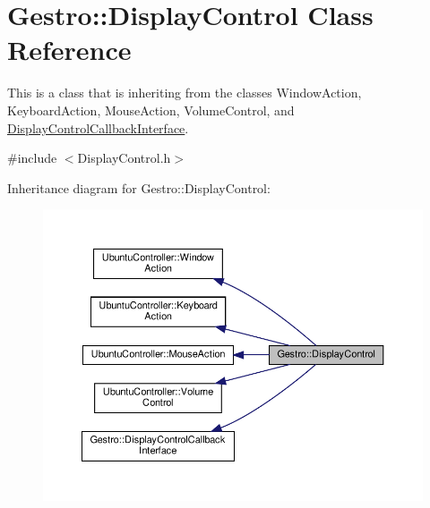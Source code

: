 \hypertarget{classGestro_1_1DisplayControl}{}\section{Gestro\+:\+:Display\+Control Class Reference}
\label{classGestro_1_1DisplayControl}


This is a class that is inheriting from the classes Window\+Action, Keyboard\+Action, Mouse\+Action, Volume\+Control, and \hyperlink{classGestro_1_1DisplayControlCallbackInterface}{Display\+Control\+Callback\+Interface}.  




{\ttfamily \#include $<$Display\+Control.\+h$>$}



Inheritance diagram for Gestro\+:\+:Display\+Control\+:
\nopagebreak
\begin{figure}[H]
\begin{center}
\leavevmode
\includegraphics[width=350pt]{classGestro_1_1DisplayControl__inherit__graph}
\end{center}
\end{figure}


